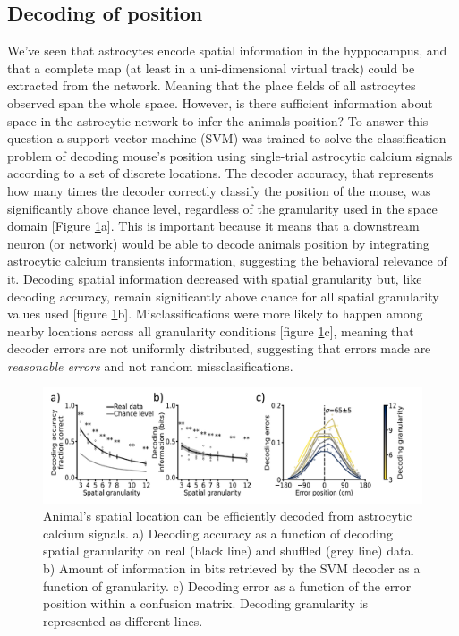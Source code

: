 \subsection{Decoding of position}
\label{chap1:sec:3:subsec3:position_decoding}
We've seen that astrocytes encode spatial information in the hyppocampus, and that a complete map (at least in a uni-dimensional virtual track) could be extracted from the network. Meaning that the place fields of all astrocytes observed span the whole space.
However, is there sufficient information about space in the astrocytic network to infer the animals position? 
To answer this question a support vector machine (SVM) was trained to solve the classification problem of decoding mouse's position using single-trial astrocytic calcium signals according to a set of discrete locations. 
The decoder accuracy, that represents how many times the decoder correctly classify the position of the mouse, was significantly above chance level, regardless of the granularity used in the space domain [Figure \ref{fig:chap1:seba_3}a]. 
This is important because it means that a downstream neuron (or network) would be able to decode animals position by integrating astrocytic calcium transients information, suggesting the behavioral relevance of it. 
Decoding spatial information decreased with spatial granularity but, like decoding accuracy, remain significantly above chance for all spatial granularity values used [figure \ref{fig:chap1:seba_3}b].  
Misclassifications were more likely to happen among nearby locations across all granularity conditions [figure \ref{fig:chap1:seba_3}c], meaning that decoder errors are not uniformly distributed, suggesting that errors made are \textit{reasonable errors} and not random missclasifications.
\begin{figure}[t]
    \centering
    \includegraphics[width=\textwidth]{Figures/Chapter1/intro_fig_seba_3.pdf}
    \caption{Animal’s spatial location can be efficiently decoded from astrocytic calcium signals. a) Decoding accuracy as a function of decoding spatial granularity on real (black line) and shuffled (grey line) data. b) Amount of information in bits retrieved by the SVM decoder as a function of granularity. c) Decoding error as a function of the error position within a confusion matrix. Decoding granularity is represented as different lines.}
    \label{fig:chap1:seba_3}
\end{figure}


